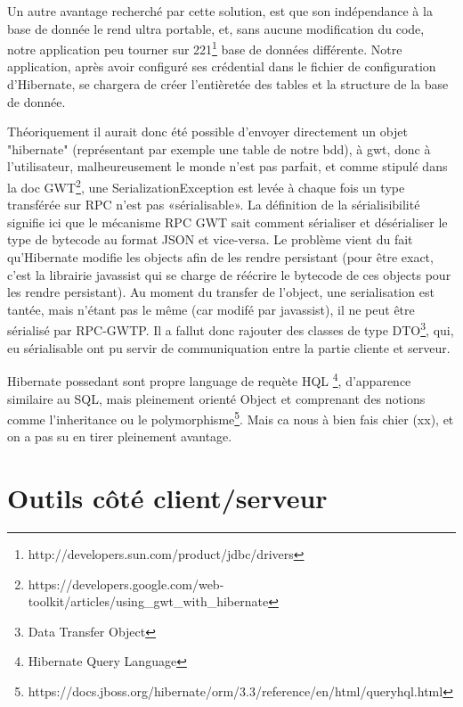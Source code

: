 Un autre avantage recherché par cette solution, est que son indépendance à la base de donnée le rend ultra portable, et, sans aucune modification du code, notre application peu tourner sur 221\footnote{http://developers.sun.com/product/jdbc/drivers} base de données différente.  Notre application, après avoir configuré ses crédential dans le fichier de configuration d'Hibernate, se chargera de créer l'entièretée des tables et la structure de la base de donnée.

Théoriquement il aurait donc été possible d'envoyer directement un objet "hibernate" (représentant par exemple une table de notre bdd), à gwt, donc à l'utilisateur, malheureusement le monde n'est pas parfait, et comme stipulé dans la doc GWT\footnote{https://developers.google.com/web-toolkit/articles/using\_gwt\_with\_hibernate},
une SerializationException est levée à chaque fois un type transférée sur RPC n'est pas «sérialisable». La définition de la sérialisibilité signifie ici que le mécanisme RPC GWT sait comment sérialiser et désérialiser le type de bytecode au format JSON et vice-versa.
Le problème vient du fait qu'Hibernate modifie les objects afin de les rendre persistant (pour être exact, c'est la librairie javassist qui se charge de réécrire le bytecode de ces objects pour les rendre persistant). Au moment du transfer de l'object, une serialisation est tantée, mais n'étant pas le même (car modifé par javassist), il ne peut être sérialisé par RPC-GWTP.
Il a fallut donc rajouter des classes de type DTO\footnote{Data Transfer Object}, qui, eu sérialisable ont pu servir de communiquation entre la partie cliente et serveur.

Hibernate possedant sont propre language de requète HQL \footnote{Hibernate Query Language}, d'apparence similaire au SQL, mais pleinement orienté Object et comprenant des notions comme l'inheritance ou le polymorphisme\footnote{https://docs.jboss.org/hibernate/orm/3.3/reference/en/html/queryhql.html}.  Mais ca nous à bien fais chier (xx), et on a pas su en tirer pleinement avantage.




\section{Outils côté client/serveur}





